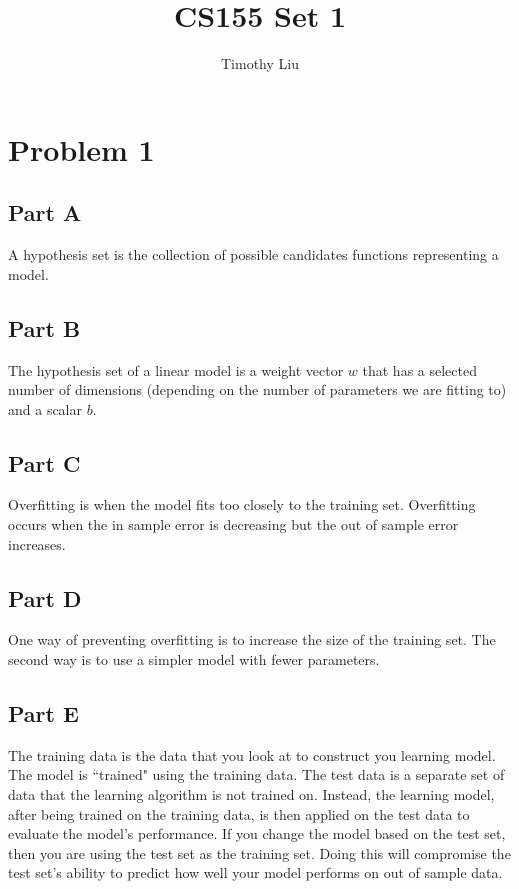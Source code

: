 \documentclass[12pt]{article} %
\title{CS155 Set 1}
\author{Timothy Liu}
\begin{document}
\maketitle

\newpage
\section{Problem 1}
\subsection{Part A}
A hypothesis set is the collection of possible candidates functions representing a model.

\subsection{Part B}
The hypothesis set of a linear model is a weight vector $w$ that has a selected number of dimensions (depending on the number of parameters we are fitting to) and a scalar $b$.

\subsection{Part C}
Overfitting is when the model fits too closely to the training set. Overfitting occurs when the in sample error is decreasing but the out of sample error increases.

\subsection{Part D}
One way of preventing overfitting is to increase the size of the training set. The second way is to use a simpler model with fewer parameters.

\subsection{Part E}
The training data is the data that you look at to construct you learning model. The model is ``trained" using the training data. The test data is a separate set of data that the learning algorithm is not trained on. Instead, the learning model, after being trained on the training data, is then applied on the test data to evaluate the model's performance. If you change the model based on the test set, then you are using the test set as the training set. Doing this will compromise the test set's ability to predict how well your model performs on out of sample data.
\end{document}
